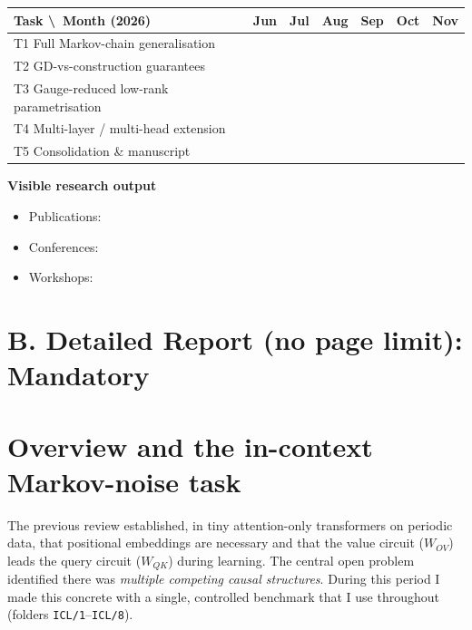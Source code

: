 \documentclass[12pt]{article}
\newcommand{\g}[1]{\cellcolor{gray!45}#1}
\begin{document}
\begin{center}
\begin{tabular}{|p{5.6cm}|c|c|c|c|c|c|}
\hline
\textbf{Task \textbackslash\ Month (2026)} & Jun & Jul & Aug & Sep & Oct & Nov\\
\hline
T1 Full Markov-chain generalisation & \g{} & \g{} & \g{} & & & \\
\hline
T2 GD-vs-construction guarantees & & \g{} & \g{} & \g{} & & \\
\hline
T3 Gauge-reduced low-rank parametrisation & & & \g{} & \g{} & \g{} & \\
\hline
T4 Multi-layer / multi-head extension & & & & \g{} & \g{} & \g{} \\
\hline
T5 Consolidation \& manuscript & & & & & \g{} & \g{} \\
\hline
\end{tabular}
\end{center}

\medskip
\noindent\textbf{Visible research output}
\begin{itemize}
\item Publications:
\item Conferences:
\item Workshops:
\end{itemize}

\newpage
\section*{B. Detailed Report (no page limit): Mandatory}

\section{Overview and the in-context Markov-noise task}
The previous review established, in tiny attention-only transformers on periodic data, that
positional embeddings are necessary and that the value circuit ($W_{OV}$) leads the query circuit
($W_{QK}$) during learning. The central open problem identified there was \emph{multiple competing
causal structures}. During this period I made this concrete with a single, controlled benchmark
that I use throughout (folders \texttt{ICL/1}--\texttt{ICL/8}).
\end{document}
